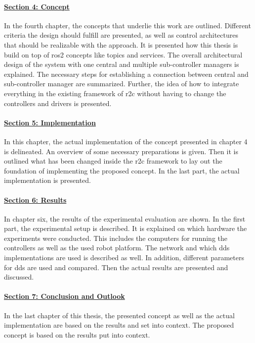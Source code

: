\paragraph{\hyperref[sec:concept]{Section 4: Concept}}
In the fourth chapter, the concepts that underlie this work are outlined. Different criteria the design should fulfill are presented, as well as control architectures that should be realizable with the approach. It is presented how this thesis is build on top of \gls{ros2} concepts like \glspl{topic} and \glspl{service}. The overall architectural design of the system with one central and multiple sub-controller managers is explained. The necessary steps for establishing a connection between central and sub-controller manager are summarized. Further, the idea of how to integrate everything in the existing framework of \gls{r2c} without having to change the controllers and drivers is presented.

\paragraph{\hyperref[sec:implementation]{Section 5: Implementation}}
In this chapter, the actual implementation of the concept presented in chapter 4 is delineated. An overview of some necessary preparations is given. Then it is outlined what has been changed inside the \gls{r2c} framework to lay out the foundation of implementing the proposed concept. In the last part, the actual implementation is presented.

\paragraph{\hyperref[sec:results]{Section 6: Results}}
In chapter six, the results of the experimental evaluation are shown. In the first part, the experimental setup is described. It is explained on which hardware the experiments were conducted. This includes the computers for running the controllers as well as the used robot platform. The network and which \gls{dds} implementations are used is described as well. In addition, different parameters for \gls{dds} are used and compared. Then the actual results are presented and discussed.

\paragraph{\hyperref[sec:conclusion_and_outlook]{Section 7: Conclusion and Outlook}}
In the last chapter of this thesis, the presented concept as well as the actual implementation are  based on the results and set into context. The proposed concept is based on the results put into context.